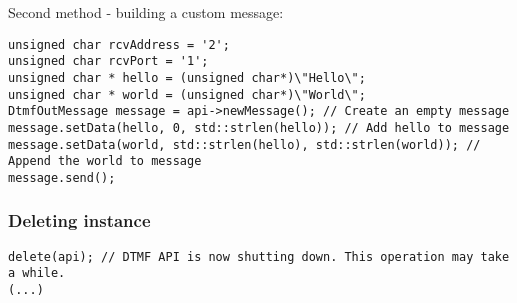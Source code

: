 Second method - building a custom message:
\begin{lstlisting}[float=htb,language={[ANSI]C++},caption={Sending data example 2},label=SendingDataEx2]
unsigned char rcvAddress = '2';
unsigned char rcvPort = '1';
unsigned char * hello = (unsigned char*)\"Hello\";
unsigned char * world = (unsigned char*)\"World\";
DtmfOutMessage message = api->newMessage(); // Create an empty message
message.setData(hello, 0, std::strlen(hello)); // Add hello to message
message.setData(world, std::strlen(hello), std::strlen(world)); // Append the world to message
message.send();
\end{lstlisting}


\subsubsection{Deleting instance}
\begin{lstlisting}[float=htb,language={[ANSI]C++},caption={Deleting instance example},label=DeletingInstanceEx]
delete(api); // DTMF API is now shutting down. This operation may take a while.
(...)
\end{lstlisting}
